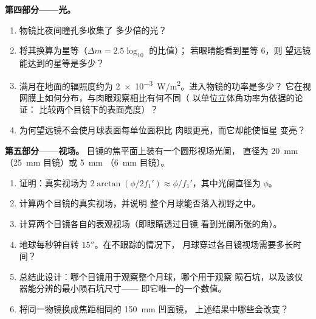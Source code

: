 \begin{problem}
\medskip
\noindent\textbf{第四部分——光。}
\begin{enumerate}[resume]
  \item 物镜比夜间瞳孔多收集了
        多少倍的光？
  \item 将其换算为星等（$\Delta m = 2.5\log_{10}$ 的比值）；
        若眼睛能看到星等 $6$，则
        望远镜能达到的星等是多少？
  \item 满月在地面的辐照度约为
        \qty{2e-3}{W/m^2}。进入物镜的功率是多少？
        它在视网膜上如何分布，与肉眼观察相比有何不同（
        以单位立体角功率为依据的论证：
        比较两个目镜下的表面亮度）？
  \item 为何望远镜不会使月球表面每单位面积比
        肉眼更亮，而它却能使恒星
        变亮？
\end{enumerate}

\medskip
\noindent\textbf{第五部分——视场。}
目镜的焦平面上装有一个圆形视场光阑，
直径为 \qty{20}{mm}（\qty{25}{mm} 目镜）或 \qty{5}{mm}
（\qty{6}{mm} 目镜）。
\begin{enumerate}[resume]
  \item 证明：真实视场为 $2\arctan(\phi/2f_1')
        \approx \phi/f_1'$，其中光阑直径为 $\phi$。
  \item 计算两个目镜的真实视场，并说明
        整个月球能否落入视野之中。
  \item 计算两个目镜各自的表观视场（即眼睛透过目镜
        看到光阑所张的角）。
  \item 地球每秒钟自转 $15''$。在不跟踪的情况下，
        月球穿过各目镜视场需要多长时间？
  \item 总结此设计：哪个目镜用于观察整个月球，哪个用于观察
        陨石坑，以及该仪器能分辨的最小陨石坑尺寸——
        即它唯一的一个数值。
  \item 将同一物镜换成焦距相同的 \qty{150}{mm} 凹面镜，
        上述结果中哪些会改变？
\end{enumerate}
\end{problem}
